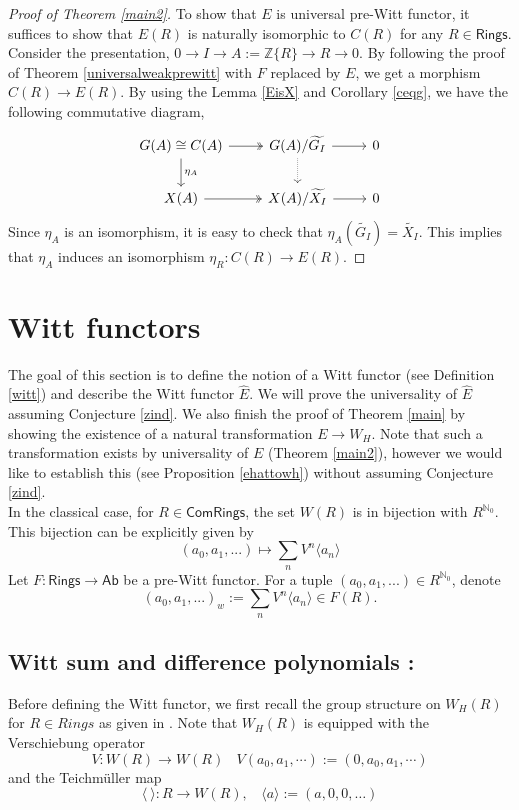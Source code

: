 \documentclass[11pt]{amsart}
\theoremstyle{plain}
\theoremstyle{definition}
\renewcommand{\tilde}{\widetilde}
\newcommand{\N}{{\mathbb N}}
\newcommand{\Z}{{\mathbb Z}}
\newcommand{\ab}[1]{\langle {#1} \rangle}
\newcommand{\Rings}{{\mathsf{Rings}}}
\newcommand{\Com}{{\mathsf{ComRings}}}
\newcommand{\Ab}{{\mathsf{Ab}}}
\begin{document}
\begin{proof}[Proof of Theorem \ref{main2}] To show that $E$ is universal pre-Witt functor, it suffices to show that $E(R)$ is naturally isomorphic to $C(R)$ for any $R \in \Rings$. Consider the presentation, $0 \to I \to A:=\Z\{R\} \to R \to 0$. By following the proof of Theorem \ref{universalweakprewitt} with $F$ replaced by $E$, we get a morphism $C(R) \to E(R)$. By using the Lemma \ref{EisX} and Corollary \ref{ceqg}, we have the following commutative diagram,
\[
\begin{tikzcd}
  G(A) \cong C(A) \arrow[r, two heads]  \arrow[d, "\eta_{A}"] &  G(A)/\tilde{G_I} \arrow[r] \arrow[d, densely dotted] & 0 \\
   X(A) \arrow[r, two heads] &  X(A)/\tilde{X_I}  \arrow[r]              & 0
\end{tikzcd}
\]
Since $\eta_{A}$ is an isomorphism, it is easy to check that $\eta_{A}(\tilde{G_I}) = \tilde{X_I}$. This implies that $\eta_{A}$ induces an isomorphism $\eta_R: C(R) \to E(R)$. 
\end{proof}

\section{Witt functors}

\noindent The goal of this section is to define the notion of a Witt functor (see Definition \ref{witt}) and describe the Witt functor $\hat{E}$. We will prove the universality of $\hat{E}$ assuming Conjecture \ref{zind}.  We also finish the proof of Theorem \ref{main} by showing the existence of a natural transformation $E \to W_H$. Note that such a transformation exists by universality of $E$ (Theorem \ref{main2}), however we would like to establish this (see Proposition \ref{ehattowh})  without assuming Conjecture \ref{zind}. \\

\noindent In the classical case, for $R \in \Com$, the set $W(R)$ is in bijection with $R^{\N_0}$. This bijection can be explicitly given by 
$$ (a_0, a_1, ...) \mapsto \sum_n V^n\ab{a_n}$$
Let $F: \Rings \to \Ab$ be a pre-Witt functor. For a tuple $(a_0, a_1,...) \in R^{\N_0}$, denote $$(a_0, a_1,...)_w  := \sum_n V^n\ab{a_n} \in F(R).$$

\subsection{Witt sum and difference polynomials :} Before defining the Witt functor, we first recall the group structure on $W_H(R)$ for $R \in Rings$ as given in \cite[1.5, 1.6]{h1}. Note that $W_H(R)$ is equipped with the Verschiebung operator  
$$V: W(R) \to W(R) \ \ \ \  V (a_0,a_1,\cdots):= (0,a_0,a_1,\cdots) $$ 
and the Teichm\"uller map 
$$ \langle \ \rangle : R \longrightarrow W(R), \ \ \ \  \langle a\rangle := ( a,0,0,\ldots)$$
\end{document}
